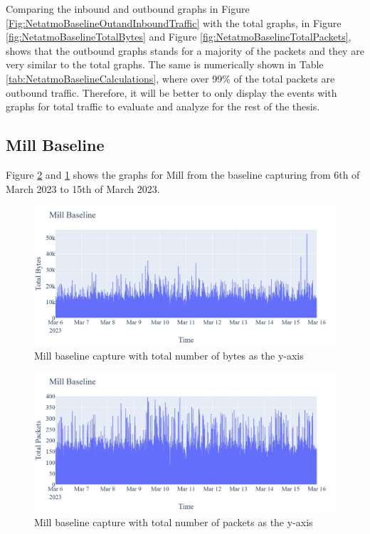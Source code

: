 Comparing the inbound and outbound graphs in Figure \ref{Fig:NetatmoBaselineOutandInboundTraffic} with the total graphs, in Figure \ref{fig:NetatmoBaselineTotalBytes} and Figure \ref{fig:NetatmoBaselineTotalPackets}, shows that the outbound graphs stands for a majority of the packets and they are very similar to the total graphs. The same is numerically shown in Table \ref{tab:NetatmoBaselineCalculations}, where over 99\% of the total packets are outbound traffic. Therefore, it will be better to only display the events with graphs for total traffic to evaluate and analyze for the rest of the thesis. 

\subsection{Mill Baseline}
Figure \ref{fig:MillBaselineTotalPackets} and \ref{fig:MillBaselineTotalBytes} shows the graphs for Mill from the baseline capturing from 6th of March 2023 to 15th of March 2023. 
\begin{figure} [H]
    \centering
    \includegraphics[scale=0.3]{figures/Mill_Baseline_TotalBytes.png}
    \caption{Mill baseline capture with total number of bytes as the y-axis}
    \label{fig:MillBaselineTotalBytes}
\end{figure}

\begin{figure} [H]
    \centering
    \includegraphics[scale=0.3]{figures/Mill_Baseline_TotalPackets.png}
    \caption{Mill baseline capture with total number of packets as the y-axis}
    \label{fig:MillBaselineTotalPackets}
 \end{figure}

